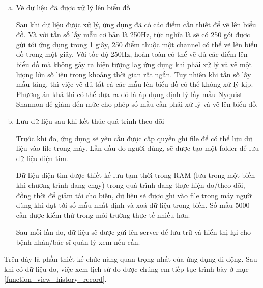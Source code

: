 \begin{enumerate} [a)]
  \item Vẽ dữ liệu đã được xử lý lên biểu đồ

    Sau khi dữ liệu được xử lý, ứng dụng đã có các điểm cần thiết để vẽ lên biểu đồ. Và với tần số lấy mẫu cơ bản là 250Hz, 
    tức nghĩa là sẽ có 250 gói được gửi tới ứng dụng trong 1 giây, 250 điểm thuộc một channel có thể vẽ lên biểu đồ trong một giây.
    Với tốc độ 250Hz, hoàn toàn có thể vẽ đủ các điểm lên biểu đồ mà không gây ra hiện tượng lag ứng dụng khi phải xử lý và vẽ một
    lượng lớn số liệu trong khoảng thời gian rất ngắn. Tuy nhiên khi tần số lấy mẫu tăng, thì việc vẽ đủ tất cả các mẫu lên
    biểu đồ có thể không xử lý kịp. Phương án khả thi có thể đưa ra đó là áp dụng định lý lấy mẫu Nyquist-Shannon để giảm
    đến mức cho phép số mẫu cần phải xử lý và vẽ lên biểu đồ.

  \item Lưu dữ liệu sau khi kết thúc quá trình theo dõi
    
    Trước khi đo, ứng dụng sẽ yêu cầu được cấp quyền ghi file để có thể lưu dữ liệu vào file trong máy. Lần đầu đo người dùng,
    sẽ được tạo một folder để lưu dữ liệu điện tim.
  
    Dữ liệu điện tim được thiết kế lưu tạm thời trong RAM (lưu trong một biến khi chương trình đang chạy) trong quá trình 
    đang thực hiện đo/theo dõi, đồng thời để giảm tải cho biến, dữ liệu sẽ được ghi vào file trong máy người dùng khi đạt tới số mẫu nhất định và xoá dữ liệu trong biến.
    Số mẫu 5000 cần được kiểm thử trong môi trường thực tế nhiều hơn.

    Sau mỗi lần đo, dữ liệu sẽ được gửi lên server để lưu trữ và hiển thị lại cho bệnh nhân/bác sĩ quản lý xem nếu cần.

\end{enumerate}
Trên đây là phần thiết kế chức năng quan trọng nhất của ứng dụng di động. Sau khi có dữ liệu đo, việc xem lịch sử đo được chúng em 
tiếp tục trình bày ở mục \ref{function_view_history_record}.

